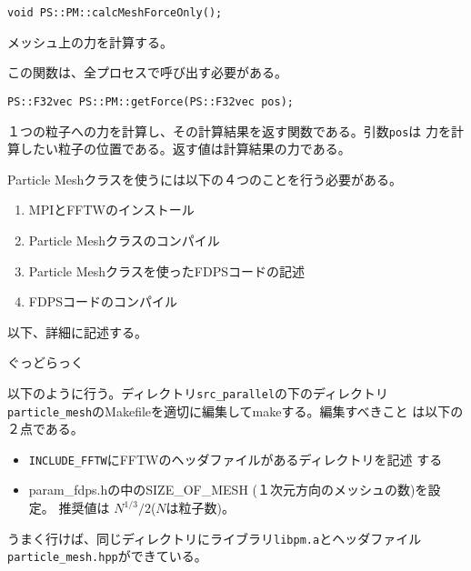 
\begin{screen}
\begin{verbatim}
void PS::PM::calcMeshForceOnly();
\end{verbatim}
\end{screen}

メッシュ上の力を計算する。

この関数は、全プロセスで呼び出す必要がある。


\begin{screen}
\begin{verbatim}
PS::F32vec PS::PM::getForce(PS::F32vec pos);
\end{verbatim}
\end{screen}

１つの粒子への力を計算し、その計算結果を返す関数である。引数{\tt pos}は
力を計算したい粒子の位置である。返す値は計算結果の力である。


Particle Meshクラスを使うには以下の４つのことを行う必要がある。
\begin{enumerate}
\item MPIとFFTWのインストール
\item Particle Meshクラスのコンパイル
\item Particle Meshクラスを使ったFDPSコードの記述
\item FDPSコードのコンパイル
\end{enumerate}
以下、詳細に記述する。


ぐっどらっく


以下のように行う。ディレクトリ{\tt src\_parallel}の下のディレクトリ
{\tt particle\_mesh}のMakefileを適切に編集してmakeする。編集すべきこと
は以下の２点である。
\begin{itemize}
\item {\tt INCLUDE\_FFTW}にFFTWのヘッダファイルがあるディレクトリを記述
  する
\item param\_fdps.hの中のSIZE\_OF\_MESH (１次元方向のメッシュの数)を設定。
推奨値は $N^{1/3}/2$($N$は粒子数)。
\end{itemize}
うまく行けば、同じディレクトリにライブラリ{\tt libpm.a}とヘッダファイル
{\tt particle\_mesh.hpp}ができている。

